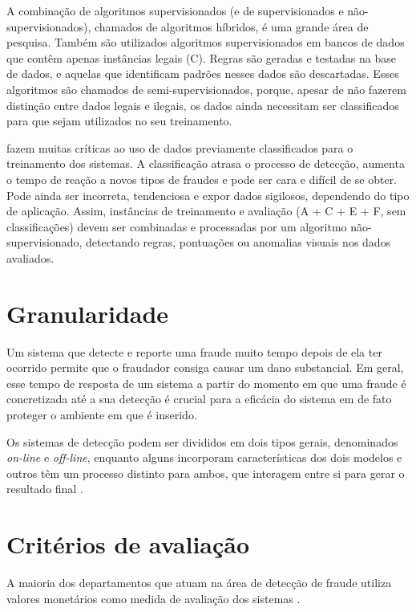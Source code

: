 A combinação de algoritmos supervisionados (e de supervisionados e não-supervisionados), chamados de algoritmos híbridos, é uma grande área de pesquisa. Também são utilizados algoritmos supervisionados em bancos de dados que contêm apenas instâncias legais (C). Regras são geradas e testadas na base de dados, e aquelas que identificam padrões nesses dados são descartadas. Esses algoritmos são chamados de semi-supervisionados, porque, apesar de não fazerem distinção entre dados legais e ilegais, os dados ainda necessitam ser classificados para que sejam utilizados no seu treinamento.

\citet{Phua2010} fazem muitas críticas ao uso de dados previamente classificados para o treinamento dos sistemas. A classificação atrasa o processo de detecção, aumenta o tempo de reação a novos tipos de fraudes e pode ser cara e difícil de se obter. Pode ainda ser incorreta, tendenciosa e expor dados sigilosos, dependendo do tipo de aplicação. Assim, instâncias de treinamento e avaliação (A + C + E + F, sem classificações) devem ser combinadas e processadas por um algoritmo não-supervisionado, detectando regras, pontuações ou anomalias visuais nos dados avaliados.

\section{Granularidade}

Um sistema que detecte e reporte uma fraude muito tempo depois de ela ter ocorrido permite que o fraudador consiga causar um dano substancial. Em geral, esse tempo de resposta de um sistema a partir do momento em que uma fraude é concretizada até a sua detecção é crucial para a eficácia do sistema em de fato proteger o ambiente em que é inserido.

Os sistemas de detecção podem ser divididos em dois tipos gerais, denominados \emph{on-line} e \emph{off-line}, enquanto alguns incorporam características dos dois modelos e outros têm um processo distinto para ambos, que interagem entre si para gerar o resultado final \cite{Huang2010}.

\section{Critérios de avaliação}

A maioria dos departamentos que atuam na área de detecção de fraude utiliza valores monetários como medida de avaliação dos sistemas \cite{Phua2010}.

